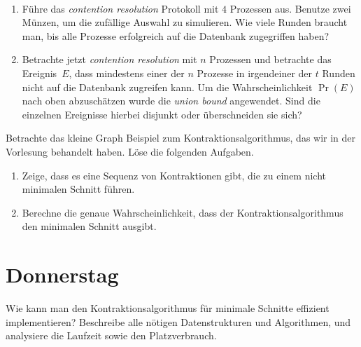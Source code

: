 \documentclass{uebung_cs}
\begin{document}
\begin{aufgabe}\
	\begin{enumerate}
		\item 
		Führe das \textit{contention resolution} Protokoll mit $4$ Prozessen aus. Benutze zwei Münzen, um die zufällige Auswahl zu simulieren. Wie viele Runden braucht man, bis alle Prozesse erfolgreich auf die Datenbank zugegriffen haben?
		\item Betrachte jetzt \textit{contention resolution} mit $n$ Prozessen und betrachte das Ereignis~$E$, dass mindestens einer der $n$ Prozesse in irgendeiner der $t$ Runden nicht auf die Datenbank zugreifen kann.
		Um die Wahrscheinlichkeit $\Pr(E)$ nach oben abzuschätzen wurde die \textit{union bound} angewendet. Sind die einzelnen Ereignisse hierbei disjunkt oder überschneiden sie sich?
	\end{enumerate}
\end{aufgabe}    

\begin{aufgabe}[Minimaler Schnitt]
	Betrachte das \glqq kleine Graph\grqq{} Beispiel zum Kontraktionsalgorithmus, das wir in der Vorlesung behandelt haben. Löse die folgenden Aufgaben.
	\begin{enumerate}
		\item Zeige, dass es eine Sequenz von Kontraktionen gibt, die zu einem nicht minimalen Schnitt führen.
		\item Berechne die genaue Wahrscheinlichkeit, dass der Kontraktionsalgorithmus den minimalen Schnitt ausgibt.
	\end{enumerate}
\end{aufgabe}

\section*{Donnerstag}

\begin{aufgabe}
	Wie kann man den Kontraktionsalgorithmus für minimale Schnitte effizient implementieren? Beschreibe alle nötigen Datenstrukturen und Algorithmen, und analysiere die Laufzeit sowie den Platzverbrauch.
\end{aufgabe}
\end{document}
